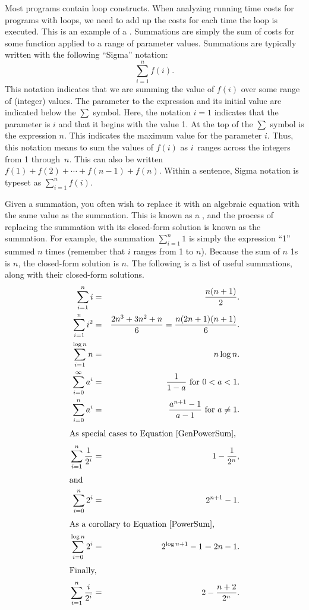 Most programs contain loop constructs.
When analyzing running time costs for programs with loops, we
need to add up the costs for each time the loop is executed.
This is an example of a .
Summations are simply the sum of costs for some function applied to a
range of parameter values.
Summations are typically written with the following ``Sigma''
notation:
\[\sum_{i=1}^{n} f(i).\]
\noindent This notation indicates that we are summing the value of
\(f(i)\) over some range of (integer) values.
The parameter to the expression and its initial value are indicated
below the \(\sum\) symbol.
Here, the notation \(i=1\) indicates that the parameter is \(i\) and that
it begins with the value 1.
At the top of the \(\sum\) symbol is the expression \(n\).
This indicates the maximum value for the parameter \(i\).
Thus, this notation means to sum the values of \(f(i)\) as \(i\)~ranges
across the integers from 1 through~\(n\).
This can also be written
\(f(1) + f(2) + \cdots + f(n-1) + f(n).\)
\noindent Within a sentence, Sigma notation is typeset as
\(\sum_{i=1}^{n} f(i).\)

Given a summation, you often wish to replace it with an algebraic
equation with the same value as the summation.
This is known as a ,
and the process of replacing the summation with its closed-form
solution is known as  the summation.
For example, the summation
\(\sum_{i=1}^{n} 1\)
is simply the expression ``1'' summed \(n\) times (remember
that \(i\) ranges from 1 to \(n\)).
Because the sum of \(n\) 1s is \(n\),
the closed-form solution is \(n\).
The following is a list of useful summations,
along with their closed-form solutions.
\addtolength{\jot}{1pt}
\begin{eqnarray}
\sum_{i = 1}^{n} i &=& \frac{n (n+1)}{2}.\label{Sumi}\\
\sum_{i = 1}^{n} i^2 &=& \frac{2 n^3 + 3 n^2 + n}{6} =
\frac{n(2n + 1)(n + 1)}{6}.\label{SumSquare}\\
\sum_{i = 1}^{\log n} n &=& n \log n.\label{SumLog}\\
\sum_{i = 0}^\infty a^i &=& \frac{1}{1-a}\ \mbox{for}
  \ 0 < a < 1.\label{FracSum}\\
\sum_{i=0}^{n} a^i &=& \frac{a^{n+1} - 1}{a - 1}\ \mbox{for}
  \ a \neq 1.\label{GenPowerSum}\\
\noalign{\hbox{\rule{0in}{1pc}As special cases to
Equation~\ref{GenPowerSum},}}
\rule{0in}{1.7pc}
\sum_{i = 1}^{n} \frac{1}{2^i} &=& 1 - \frac{1}{2^n},\label{SumHalves}\\
\noalign{\hbox{\rule{0in}{1pc}and}}
\rule{0in}{1.7pc}\sum_{i = 0}^{n} 2^i &=& 2^{n+1} - 1.\label{PowerSum}\\
\noalign{\hbox{\rule{0in}{1pc}As a corollary to
Equation~\ref{PowerSum},}}
\rule{0in}{1.7pc}\sum_{i = 0}^{\log n} 2^i &=& 2^{\log n + 1} - 1 =
2n - 1.\label{SumExLog}\\
\noalign{\hbox{\rule{0in}{1pc}Finally,}}
\rule{0in}{1.7pc}
\sum_{i=1}^{n} \frac{i}{2^i} &=& 2 - \frac{n+2}{2^n}.\label{IHalvesSum}
\end{eqnarray}

